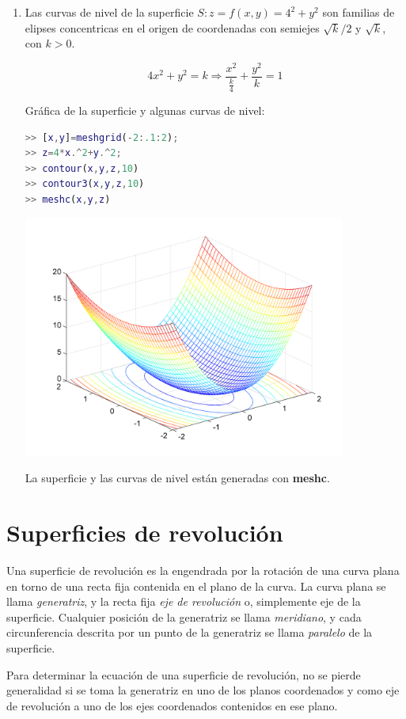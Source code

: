 \begin{enumerate}
\item Las curvas de nivel de la superficie $S: z = f(x,y) = 4^{2} + y^{2}$ son familias de elipses concentricas en el origen de coordenadas con semiejes  $\sqrt{k}/2$ y  $\sqrt{k}$, con $k>0$. 

$$ 4x^{2}+y^{2} = k \Rightarrow \dfrac{x^{2}}{\frac{k}{4}} + \dfrac{y^{2}}{k} = 1 $$

Gráfica de la superficie y algunas curvas de nivel:
\begin{lstlisting}[language=Matlab]
>> [x,y]=meshgrid(-2:.1:2); 
>> z=4*x.^2+y.^2; 
>> contour(x,y,z,10)
>> contour3(x,y,z,10) 
>> meshc(x,y,z)
\end{lstlisting}
\includegraphics[width=300pt]{./Imagenes/curvanivel1.png}

La superficie y las curvas de nivel están generadas con \textbf{meshc}.
\end{enumerate} 

\section{Superficies de revolución}

Una superficie de revolución es la engendrada por la rotación de una curva plana en torno de 
una recta fija contenida en el plano de la curva. La curva plana se llama \textit{generatriz}, y la recta fija \textit{eje de revolución} o, simplemente eje de la superficie. Cualquier posición de la generatriz se llama \textit{meridiano}, y cada circunferencia descrita por un punto de la generatriz se llama \textit{paralelo} de la superficie.

Para determinar la ecuación de una superficie de revolución, no se pierde generalidad si se toma la generatriz en uno de los planos coordenados y como eje de revolución a uno de los ejes 
coordenados contenidos en ese plano.


